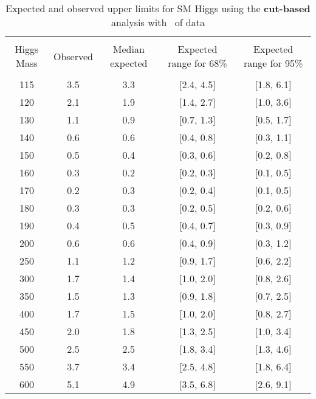 \begin{table}[hbp!]
\begin{center}
\begin{tabular}{c c c c c}
\hline
\vspace{-3mm} && \\
 Higgs Mass   & Observed & Median expected & Expected range for 68\% & Expected range for 95\%   \\
\vspace{-3mm} && \\
\hline
115 & 3.5 & 3.3 & [2.4, 4.5] & [1.8, 6.1] \\
120 & 2.1 & 1.9 & [1.4, 2.7] & [1.0, 3.6] \\
130 & 1.1 & 0.9 & [0.7, 1.3] & [0.5, 1.7] \\
140 & 0.6 & 0.6 & [0.4, 0.8] & [0.3, 1.1] \\
150 & 0.5 & 0.4 & [0.3, 0.6] & [0.2, 0.8] \\
160 & 0.3 & 0.2 & [0.2, 0.3] & [0.1, 0.5] \\
170 & 0.2 & 0.3 & [0.2, 0.4] & [0.1, 0.5] \\
180 & 0.3 & 0.3 & [0.2, 0.5] & [0.2, 0.6] \\
190 & 0.4 & 0.5 & [0.4, 0.7] & [0.3, 0.9] \\
200 & 0.6 & 0.6 & [0.4, 0.9] & [0.3, 1.2] \\
250 & 1.1 & 1.2 & [0.9, 1.7] & [0.6, 2.2] \\
300 & 1.7 & 1.4 & [1.0, 2.0] & [0.8, 2.6] \\
350 & 1.5 & 1.3 & [0.9, 1.8] & [0.7, 2.5] \\
400 & 1.7 & 1.5 & [1.0, 2.0] & [0.8, 2.7] \\
450 & 2.0 & 1.8 & [1.3, 2.5] & [1.0, 3.4] \\
500 & 2.5 & 2.5 & [1.8, 3.4] & [1.3, 4.6] \\
550 & 3.7 & 3.4 & [2.5, 4.8] & [1.8, 6.4] \\
600 & 5.1 & 4.9 & [3.5, 6.8] & [2.6, 9.1] \\
\hline
\end{tabular}
\caption{Expected and observed upper limits for SM Higgs using the
  {\bf cut-based} analysis with \intlumiEightTeV\ of data}
\label{tab:cutbase_uls}
\end{center}
\end{table}

